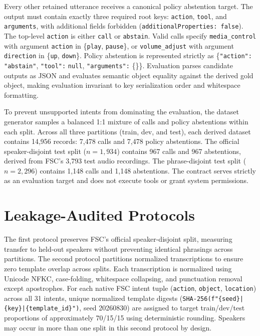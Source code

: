 \documentclass[12pt]{article}
\begin{document}
{\sloppy Every other retained utterance receives a canonical policy abstention target. The output must contain exactly three required root keys: \texttt{action}, \texttt{tool}, and \texttt{arguments}, with additional fields forbidden (\texttt{additionalProperties: false}). The top-level \texttt{action} is either \texttt{call} or \texttt{abstain}. Valid calls specify \texttt{media\_control} with argument \texttt{action} in \{\texttt{play}, \texttt{pause}\}, or \texttt{volume\_adjust} with argument \texttt{direction} in \{\texttt{up}, \texttt{down}\}. Policy abstention is represented strictly as \{\texttt{"action":} \texttt{"abstain"}, \texttt{"tool":} \texttt{null}, \texttt{"arguments":} \{\}\}. Evaluation parses candidate outputs as JSON and evaluates semantic object equality against the derived gold object, making evaluation invariant to key serialization order and whitespace formatting.\par}

To prevent unsupported intents from dominating the evaluation, the dataset generator samples a balanced 1:1 mixture of calls and policy abstentions within each split. Across all three partitions (train, dev, and test), each derived dataset contains 14{,}956 records: 7{,}478 calls and 7{,}478 policy abstentions. The official speaker-disjoint test split ($n=1{,}934$) contains 967 calls and 967 abstentions, derived from FSC's 3,793 test audio recordings. The phrase-disjoint test split ($n=2{,}296$) contains 1,148 calls and 1,148 abstentions. The contract serves strictly as an evaluation target and does not execute tools or grant system permissions.

\section{Leakage-Audited Protocols}

The first protocol preserves FSC's official speaker-disjoint split, measuring transfer to held-out speakers without preventing identical phrasings across partitions. The second protocol partitions normalized transcriptions to ensure zero template overlap across splits. Each transcription is normalized using Unicode NFKC, case-folding, whitespace collapsing, and punctuation removal except apostrophes. For each native FSC intent tuple (\texttt{action}, \texttt{object}, \texttt{location}) across all 31 intents, unique normalized template digests (\texttt{SHA-256(f"\{seed\}|\{key\}|\{template\_id\}")}, seed 20260830) are assigned to target train/dev/test proportions of approximately 70/15/15 using deterministic rounding. Speakers may occur in more than one split in this second protocol by design.
\end{document}
